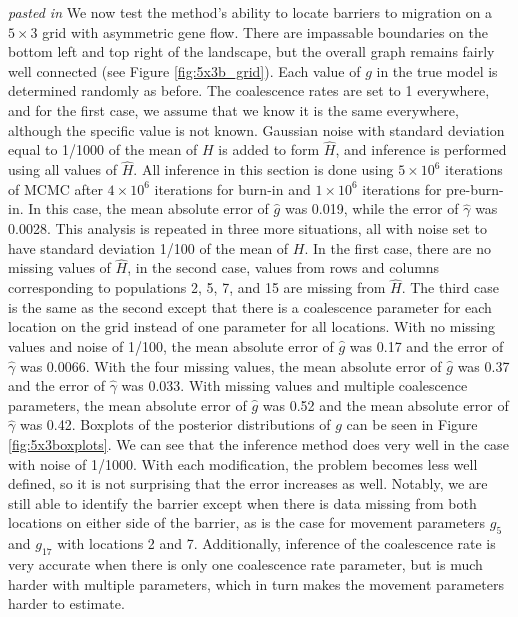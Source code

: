 \documentclass{article}
\newcommand{\plr}[1]{{\em \color{blue} #1}}
\begin{document}
\plr{pasted in}
We now test the method's ability to locate barriers to migration
on a $5 \times 3$ grid with asymmetric gene flow. 
There are impassable boundaries on the bottom left and top right of the landscape,
but the overall graph remains fairly well connected (see Figure \ref{fig:5x3b_grid}).
Each value of $g$ in the true model is determined randomly as before.
The coalescence rates are set to 1 everywhere, 
and for the first case, we assume that we know it is the same everywhere, 
although the specific value is not known.
Gaussian noise with standard deviation equal to 1/1000 of the mean of $H$ is added to form $\hat{H}$, 
and inference is performed using all values of $\hat{H}$.
All inference in this section is done using
$5 \times 10^6$ iterations of MCMC 
after $4 \times 10^6$ iterations for burn-in and $1 \times 10^6$ iterations for pre-burn-in.
In this case, the mean absolute error of $\hat{g}$ was 0.019, 
while the error of $\hat{\gamma}$ was 0.0028. %
This analysis is repeated in three more situations, 
all with noise set to have standard deviation 1/100 of the mean of $H$.
In the first case, there are no missing values of $\hat{H}$, 
in the second case, values from rows and columns
corresponding to populations 2, 5, 7, and 15 are missing from $\hat{H}$. 
The third case is the same as the second except that
there is a coalescence parameter for each location on the grid 
instead of one parameter for all locations.
With no missing values and noise of 1/100, 
the mean absolute error of $\hat{g}$ was 0.17 and the error of $\hat{\gamma}$ was 0.0066.
With the four missing values,
the mean absolute error of $\hat{g}$ was 0.37 and the error of $\hat{\gamma}$ was 0.033.
With missing values and multiple coalescence parameters, 
the mean absolute error of $\hat{g}$ was 0.52 
and the mean absolute error of $\hat{\gamma}$ was 0.42.
Boxplots of the posterior distributions of $g$ can be seen in Figure \ref{fig:5x3boxplots}.
We can see that the inference method does very well 
in the case with noise of 1/1000.
With each modification, the problem becomes less well defined, 
so it is not surprising that the error increases as well.
Notably, we are still able to identify the barrier 
except when there is data missing from both locations on either side of the barrier, 
as is the case for movement parameters $g_{5}$ and $g_{17}$ with locations 2 and 7.
Additionally, inference of the coalescence rate is very accurate 
when there is only one coalescence rate parameter,
but is much harder with multiple parameters, 
which in turn makes the movement parameters harder to estimate.
\end{document}
